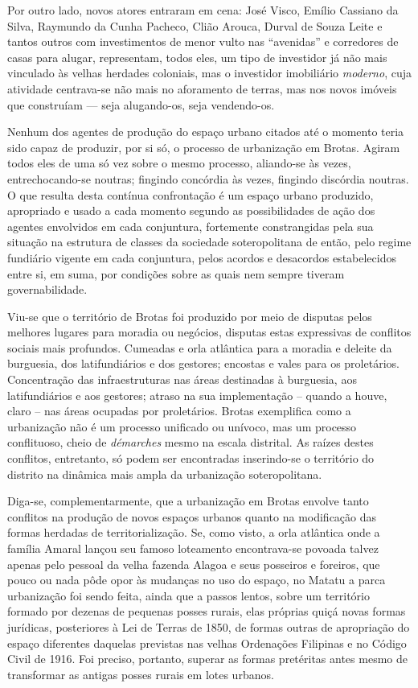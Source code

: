 Por outro lado, novos atores entraram em cena: José Visco, Emílio Cassiano da Silva, Raymundo da Cunha Pacheco, Clião Arouca, Durval de Souza Leite e tantos outros com investimentos de menor vulto nas ``avenidas'' e corredores de casas para alugar, representam, todos eles, um tipo de investidor já não mais vinculado às velhas herdades coloniais, mas o investidor imobiliário \textit{moderno}, cuja atividade centrava-se não mais no aforamento de terras, mas nos novos imóveis que construíam --- seja alugando-os, seja vendendo-os.

Nenhum dos agentes de produção do espaço urbano citados até o momento teria sido capaz de produzir, por si só, o processo de urbanização em Brotas. Agiram todos eles de uma só vez sobre o mesmo processo, aliando-se às vezes, entrechocando-se noutras; fingindo concórdia às vezes, fingindo discórdia noutras. O que resulta desta contínua confrontação é um espaço urbano produzido, apropriado e usado a cada momento segundo as possibilidades de ação dos agentes envolvidos em cada conjuntura, fortemente constrangidas pela sua situação na estrutura de classes da sociedade soteropolitana de então, pelo regime fundiário vigente em cada conjuntura, pelos acordos e desacordos estabelecidos entre si, em suma, por condições sobre as quais nem sempre tiveram governabilidade.

Viu-se que o território de Brotas foi produzido por meio de disputas pelos melhores lugares para moradia ou negócios, disputas estas expressivas de conflitos sociais mais profundos. Cumeadas e orla atlântica para a moradia e deleite da burguesia, dos latifundiários e dos gestores; encostas e vales para os proletários. Concentração das infraestruturas nas áreas destinadas à burguesia, aos latifundiários e aos gestores; atraso na sua implementação – quando a houve, claro – nas áreas ocupadas por proletários. Brotas exemplifica como a urbanização não é um processo unificado ou unívoco, mas um processo conflituoso, cheio de \textit{démarches} mesmo na escala distrital. As raízes destes conflitos, entretanto, só podem ser encontradas inserindo-se o território do distrito na dinâmica mais ampla da urbanização soteropolitana.

Diga-se, complementarmente, que a urbanização em Brotas envolve tanto conflitos na produção de novos espaços urbanos quanto na modificação das formas herdadas de territorialização. Se, como visto, a orla atlântica onde a família Amaral lançou seu famoso loteamento encontrava-se povoada talvez apenas pelo pessoal da velha fazenda Alagoa e seus posseiros e foreiros, que pouco ou nada pôde opor às mudanças no uso do espaço, no Matatu a parca urbanização foi sendo feita, ainda que a passos lentos, sobre um território formado por dezenas de pequenas posses rurais, elas próprias quiçá novas formas jurídicas, posteriores à Lei de Terras de 1850, de formas outras de apropriação do espaço diferentes daquelas previstas nas velhas Ordenações Filipinas e no Código Civil de 1916. Foi preciso, portanto, superar as formas pretéritas antes mesmo de transformar as antigas posses rurais em lotes urbanos.

